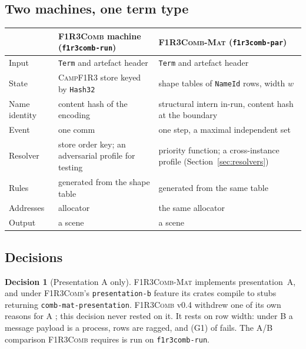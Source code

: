 \documentclass[11pt,a4paper]{article}
\newcommand{\code}[1]{\texttt{#1}}
\newcommand{\Comb}{\textsc{F1R3Comb}}
\newcommand{\Mat}{\textsc{F1R3Comb-Mat}}
\newcommand{\Camp}{\textsc{CampF1R3}}
\theoremstyle{definition}
\newtheorem{decision}[definition]{Decision}
\theoremstyle{plain}
\begin{document}
\subsection{Two machines, one term type}

\begin{center}
\begin{tabularx}{\linewidth}{@{}l>{\raggedright\arraybackslash}X>{\raggedright\arraybackslash}X@{}}
\toprule
& \Comb{} machine (\code{f1r3comb-run}) & \Mat{} (\code{f1r3comb-par})\\
\midrule
Input & \code{Term} and artefact header & \code{Term} and artefact header\\
State & \Camp{} store keyed by \code{Hash32} & shape tables of \code{NameId}
rows, width $w$\\
Name identity & content hash of the encoding & structural intern in-run,
content hash at the boundary\\
Event & one comm & one step, a maximal independent set\\
Resolver & store order key; an adversarial profile for testing
\cite[Obl.~11.2]{combspec} & priority function; a cross-instance profile
(Section~\ref{sec:resolvers})\\
Rules & generated from the shape table & generated from the same table\\
Addresses & allocator \cite[Req.~9.5]{combspec} & the same allocator\\
Output & a scene & a scene\\
\bottomrule
\end{tabularx}
\end{center}

\subsection{Decisions}

\begin{decision}[Presentation A only]\label{dec:aonly}
\Mat{} implements presentation~A, and under \Comb's \code{presentation-b}
feature its crates compile to stubs returning \code{comb-mat-presentation}.
\Comb{} v0.4 withdrew one of its own reasons for A \cite[Rem.~2.2]{combspec};
this decision never rested on it. It rests on row width: under B a message
payload is a process, rows are ragged, and (G1) of \cite[\S2.1]{matnote}
fails. The A/B comparison \Comb{} requires \cite[Obl.~11.8]{combspec} is run
on \code{f1r3comb-run}.
\end{decision}
\end{document}
